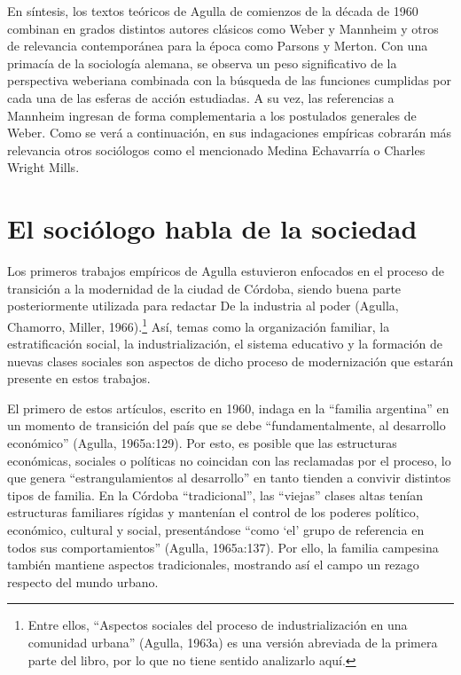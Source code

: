 En síntesis, los textos teóricos de Agulla de comienzos de la década de 1960 combinan en grados distintos autores clásicos como Weber y Mannheim y otros de relevancia contemporánea para la época como Parsons y Merton. Con una primacía de la sociología alemana, se observa un peso significativo de la perspectiva weberiana combinada con la búsqueda de las funciones cumplidas por cada una de las esferas de acción estudiadas. A su vez, las referencias a Mannheim ingresan de forma complementaria a los postulados generales de Weber. Como se verá a continuación, en sus indagaciones empíricas cobrarán más relevancia otros sociólogos como el mencionado Medina Echavarría o Charles Wright Mills.

\section{El sociólogo habla de la sociedad}

Los primeros trabajos empíricos de Agulla estuvieron enfocados en el proceso de transición a la modernidad de la ciudad de Córdoba, siendo buena parte posteriormente utilizada para redactar De la industria al poder (Agulla, Chamorro, Miller, 1966).\footnote{Entre ellos, ``Aspectos sociales del proceso de industrialización en una comunidad urbana'' (Agulla, 1963a) es una versión abreviada de la primera parte del libro, por lo que no tiene sentido analizarlo aquí.} Así, temas como la organización familiar, la estratificación social, la industrialización, el sistema educativo y la formación de nuevas clases sociales son aspectos de dicho proceso de modernización que estarán presente en estos trabajos.

El primero de estos artículos, escrito en 1960, indaga en la ``familia argentina'' en un momento de transición del país que se debe ``fundamentalmente, al desarrollo económico'' (Agulla, 1965a:129). Por esto, es posible que las estructuras económicas, sociales o políticas no coincidan con las reclamadas por el proceso, lo que genera ``estrangulamientos al desarrollo'' en tanto tienden a convivir distintos tipos de familia. En la Córdoba ``tradicional'', las ``viejas'' clases altas tenían estructuras familiares rígidas y mantenían el control de los poderes político, económico, cultural y social, presentándose ``como `el' grupo de referencia en todos sus comportamientos'' (Agulla, 1965a:137). Por ello, la familia campesina también mantiene aspectos tradicionales, mostrando así el campo un rezago respecto del mundo urbano.

